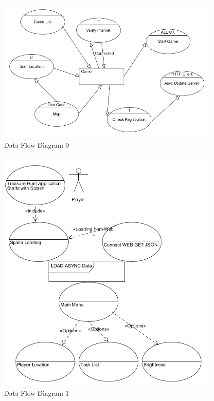 \documentclass[12pt,a4paper,times]{report}
\begin{document}
\begin{figure}[ht!]
\left
\includegraphics[width=150mm]{images/dfd0}
\caption{Data Flow Diagram 0}
\label{overflow}
\end{figure}
\newpage

\begin{figure}[ht!]
\left
\includegraphics[width=150mm]{dfd0}
\caption{Data Flow Diagram 1}
\label{overflow}
\end{figure}
\newpage
\end{document}
